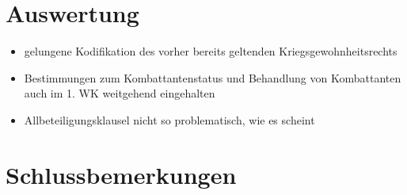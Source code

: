 \documentclass[12pt]{scrartcl}
\begin{document}
\section{Auswertung}
\begin{itemize}
	\item gelungene Kodifikation des vorher bereits geltenden Kriegsgewohnheitsrechts
	\item Bestimmungen zum Kombattantenstatus und Behandlung von Kombattanten auch im 1. WK weitgehend eingehalten
	\item Allbeteiligungsklausel nicht so problematisch, wie es scheint
\end{itemize}
\cite{Gasser1991}
\cite{Lingen2014}
\cite{Buss1992}
\cite{Fraenkel1968}
\cite{Heffter1951}
\cite{Reich2010}
\cite{Scott1920}
\cite{Scott1921}



\section{Schlussbemerkungen}


\newpage

\printbibliography
{}


\newpage
{}
\end{document}
